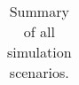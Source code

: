 \documentclass[
]{article}
\begin{document}
\begin{table}

\caption{\label{tab:unnamed-chunk-5}Summary of all simulation scenarios.}
\centering
\begin{tabular}[t]{}
\hline
\\
\hline
\\
\hline
\\
\hline
\\
\hline
\\
\hline
\\
\hline
\\
\hline
\\
\hline
\\
\hline
\\
\hline
\\
\hline
\\
\hline
\\
\hline
\\
\hline
\\
\hline
\\
\hline
\\
\hline
\\
\hline
\\
\hline
\\
\hline
\\
\hline
\\
\hline
\\
\hline
\\
\hline
\\
\hline
\\
\hline
\\
\hline
\\
\hline
\\
\hline
\\
\hline
\\
\hline
\\
\hline
\\
\hline
\\
\hline
\\
\hline
\\
\hline
\\
\hline
\\
\hline
\\
\hline
\\
\hline
\\
\hline
\\
\hline
\\
\hline
\\
\hline
\\
\hline
\\
\hline
\\
\hline
\\

\end{tabular}
\end{table}
\end{document}
